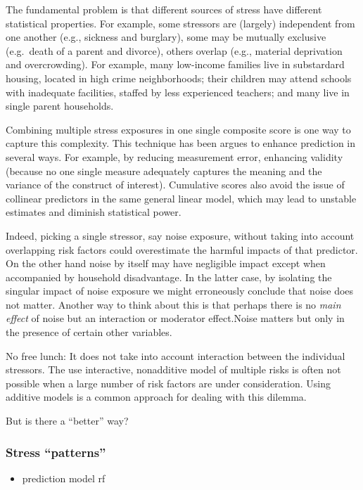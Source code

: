 \documentclass[
  letterpaper,
  DIV=11,
  numbers=noendperiod]{scrreport}
\providecommand{\tightlist}{%
  \setlength{\itemsep}{0pt}\setlength{\parskip}{0pt}}
\begin{document}
The fundamental problem is that different sources of stress have
different statistical properties. For example, some stressors are
(largely) independent from one another (e.g., sickness and burglary),
some may be mutually exclusive (e.g.~death of a parent and divorce),
others overlap (e.g., material deprivation and overcrowding). For
example, many low-income families live in substardard housing, located
in high crime neighborhoods; their children may attend schools with
inadequate facilities, staffed by less experienced teachers; and many
live in single parent households.

Combining multiple stress exposures in one single composite score is one
way to capture this complexity. This technique has been argues to
enhance prediction in several ways. For example, by reducing measurement
error, enhancing validity (because no one single measure adequately
captures the meaning and the variance of the construct of interest).
Cumulative scores also avoid the issue of collinear predictors in the
same general linear model, which may lead to unstable estimates and
diminish statistical power.

Indeed, picking a single stressor, say noise exposure, without taking
into account overlapping risk factors could overestimate the harmful
impacts of that predictor. On the other hand noise by itself may have
negligible impact except when accompanied by household disadvantage. In
the latter case, by isolating the singular impact of noise exposure we
might erroneously conclude that noise does not matter. Another way to
think about this is that perhaps there is no \emph{main effect} of noise
but an interaction or moderator effect.Noise matters but only in the
presence of certain other variables.

No free lunch: It does not take into account interaction between the
individual stressors. The use interactive, nonadditive model of multiple
risks is often not possible when a large number of risk factors are
under consideration. Using additive models is a common approach for
dealing with this dilemma.

But is there a ``better'' way?

\subsubsection{Stress ``patterns''}\label{stress-patterns}

\begin{itemize}
\tightlist
\item
  prediction model rf
\end{itemize}
\end{document}
